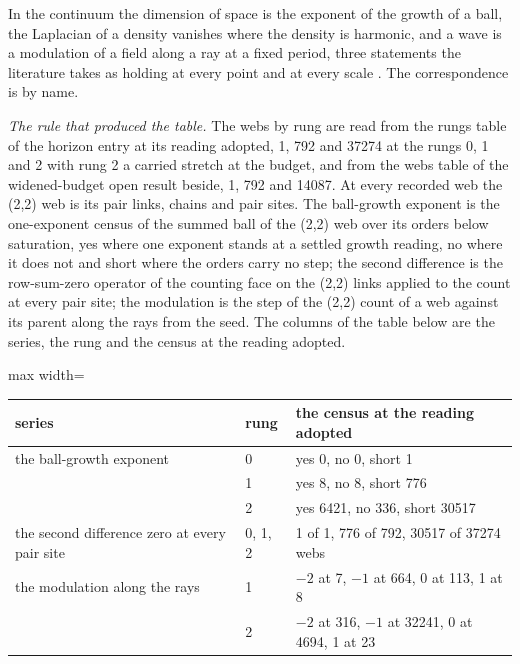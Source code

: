 \begin{chbridge}
In the continuum the dimension of space is the exponent of the growth of a ball, the Laplacian of a density vanishes where the density is harmonic, and a wave is a modulation of a field along a ray at a fixed period, three statements the literature takes as holding at every point and at every scale \cite{Wald1984,Weinberg1995}. The correspondence is by name.
\end{chbridge}
\begin{chproof}
\textit{The rule that produced the table.} The webs by rung are read from the rungs table of the horizon entry at its reading adopted, 1, 792 and 37274 at the rungs 0, 1 and 2 with rung 2 a carried stretch at the budget, and from the webs table of the widened-budget open result beside, 1, 792 and 14087. At every recorded web the (2,2) web is its pair links, chains and pair sites. The ball-growth exponent is the one-exponent census of the summed ball of the (2,2) web over its orders below saturation, yes where one exponent stands at a settled growth reading, no where it does not and short where the orders carry no step; the second difference is the row-sum-zero operator of the counting face on the (2,2) links applied to the count at every pair site; the modulation is the step of the (2,2) count of a web against its parent along the rays from the seed. The columns of the table below are the series, the rung and the census at the reading adopted.

\begin{center}
\begin{adjustbox}{max width=\linewidth}\begin{tabular}{lll}
\hline
series & rung & the census at the reading adopted \\
\hline
the ball-growth exponent & 0 & yes 0, no 0, short 1 \\
 & 1 & yes 8, no 8, short 776 \\
 & 2 & yes 6421, no 336, short 30517 \\
the second difference zero at every pair site & 0, 1, 2 & 1 of 1, 776 of 792, 30517 of 37274 webs \\
the modulation along the rays & 1 & $-2$ at 7, $-1$ at 664, 0 at 113, 1 at 8 \\
 & 2 & $-2$ at 316, $-1$ at 32241, 0 at 4694, 1 at 23 \\
\hline
\end{tabular}\end{adjustbox}
\end{center}


\end{chproof}
